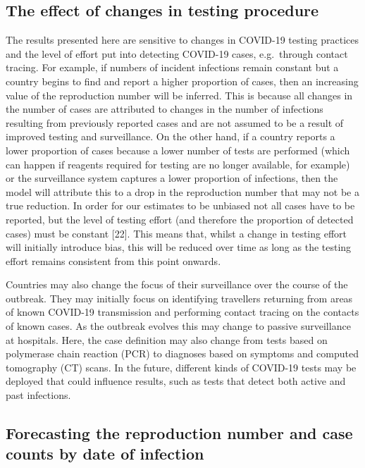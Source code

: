 \documentclass[
]{article}
\begin{document}
\hypertarget{the-effect-of-changes-in-testing-procedure}{%
\subsection{The effect of changes in testing
procedure}\label{the-effect-of-changes-in-testing-procedure}}

The results presented here are sensitive to changes in COVID-19 testing
practices and the level of effort put into detecting COVID-19 cases,
e.g.~through contact tracing. For example, if numbers of incident
infections remain constant but a country begins to find and report a
higher proportion of cases, then an increasing value of the reproduction
number will be inferred. This is because all changes in the number of
cases are attributed to changes in the number of infections resulting
from previously reported cases and are not assumed to be a result of
improved testing and surveillance. On the other hand, if a country
reports a lower proportion of cases because a lower number of tests are
performed (which can happen if reagents required for testing are no
longer available, for example) or the surveillance system captures a
lower proportion of infections, then the model will attribute this to a
drop in the reproduction number that may not be a true reduction. In
order for our estimates to be unbiased not all cases have to be
reported, but the level of testing effort (and therefore the proportion
of detected cases) must be constant {[}22{]}. This means that, whilst a
change in testing effort will initially introduce bias, this will be
reduced over time as long as the testing effort remains consistent from
this point onwards.

Countries may also change the focus of their surveillance over the
course of the outbreak. They may initially focus on identifying
travellers returning from areas of known COVID-19 transmission and
performing contact tracing on the contacts of known cases. As the
outbreak evolves this may change to passive surveillance at hospitals.
Here, the case definition may also change from tests based on polymerase
chain reaction (PCR) to diagnoses based on symptoms and computed
tomography (CT) scans. In the future, different kinds of COVID-19 tests
may be deployed that could influence results, such as tests that detect
both active and past infections.

\hypertarget{forecasting-the-reproduction-number-and-case-counts-by-date-of-infection}{%
\subsection{Forecasting the reproduction number and case counts by date
of
infection}\label{forecasting-the-reproduction-number-and-case-counts-by-date-of-infection}}
\end{document}
